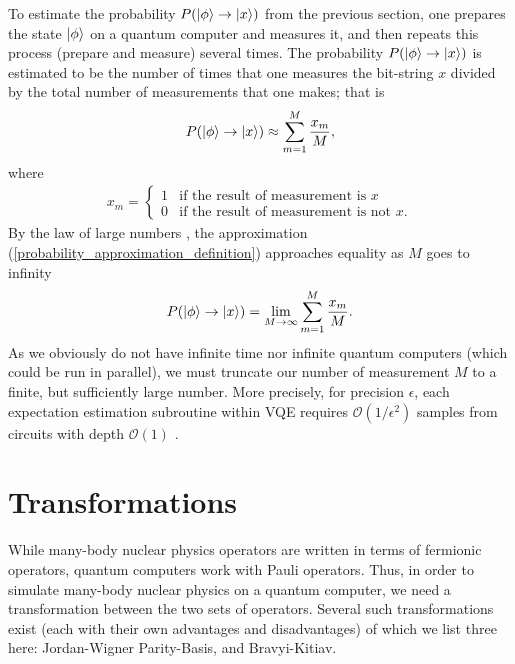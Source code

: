 \documentclass[10pt]{article}
\begin{document}
To estimate the probability $P(\ket{\phi}\to \ket{x})$ from the previous section, one prepares the state $\ket{\phi}$ on a quantum computer and measures it, and then repeats this process (prepare and measure) several times. The probability $P(\ket{\phi}\to \ket{x})$ is estimated to be the number of times that one measures the bit-string $x$ divided by the total number of measurements that one makes; that is
\begin{align}
\label{probability_approximation_definition}
P(\ket{\phi}\to \ket{x}) \approx \sum_{m=1}^M\frac{x_m}{M}
,\end{align}
where 
\begin{align}
x_m
=
\begin{cases}
1 & \text{if the result of measurement is $x$} 
\\
0 & \text{if the result of measurement is not $x$}.
\end{cases}
\end{align}
By the law of large numbers \cite{ref:lln}, the approximation (\ref{probability_approximation_definition}) approaches equality as $M$ goes to infinity
\begin{align}
\label{probability_approximation_definition}
P(\ket{\phi}\to \ket{x}) = \lim_{M\to\infty}\sum_{m=1}^M\frac{x_m}{M}
.\end{align}
As we obviously do not have infinite time nor infinite quantum computers (which could be run in parallel), we must truncate our number of measurement $M$ to a finite, but sufficiently large number. More precisely, for precision $\epsilon$, each expectation estimation subroutine within VQE requires $\mathcal{O}(1/\epsilon^2)$ samples from circuits with depth $\mathcal{O}(1)$ \cite{ref:precision}.

\section{Transformations}

While many-body nuclear physics operators are written in terms of fermionic operators, quantum computers work with Pauli operators. Thus, in order to simulate many-body nuclear physics on a quantum computer, we need a transformation between the two sets of operators. Several such transformations exist \cite{ref:transformations} (each with their own advantages and disadvantages) of which we list three here: Jordan-Wigner Parity-Basis, and Bravyi-Kitiav.
\end{document}
